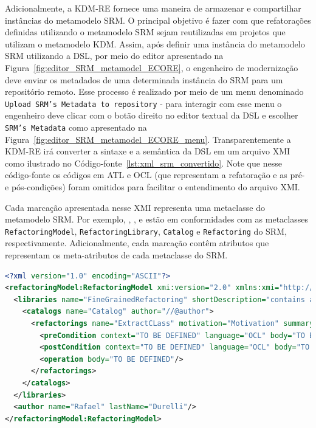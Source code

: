 Adicionalmente, a KDM-RE fornece uma maneira de armazenar e compartilhar instâncias do metamodelo SRM. O principal objetivo é fazer com que refatorações definidas utilizando o metamodelo SRM sejam reutilizadas em projetos que utilizam o metamodelo KDM. Assim, após definir uma instância do metamodelo SRM utilizando a DSL, por meio do editor apresentado na Figura~\ref{fig:editor_SRM_metamodel_ECORE}, o engenheiro de modernização deve enviar os metadados de uma determinada instância do SRM para um repositório remoto. Esse processo é realizado por meio de um menu denominado \texttt{Upload SRM's Metadata to repository} - para interagir com esse menu o engenheiro deve clicar com o botão direito no editor textual da DSL e escolher \texttt{SRM's Metadata} como apresentado na Figura~\ref{fig:editor_SRM_metamodel_ECORE_menu}. Transparentemente a KDM-RE irá converter a sintaxe e a semântica da DSL em um arquivo XMI como ilustrado no Código-fonte~\ref{lst:xml_srm_convertido}. Note que nesse código-fonte os códigos em ATL e OCL (que representam a refatoração e as pré- e pós-condições) foram omitidos para facilitar o entendimento do arquivo XMI. 

Cada marcação apresentada nesse XMI representa uma metaclasse do metamodelo SRM. Por exemplo, , ,  e  estão em conformidades com as metaclasses \texttt{RefactoringModel}, \texttt{RefactoringLibrary}, \texttt{Catalog} e \texttt{Refactoring} do SRM, respectivamente. Adicionalmente, cada marcação contêm atributos que representam os meta-atributos de cada metaclasse do SRM.

\begin{lstlisting}[language=XML, frame=single, basicstyle={\scriptsize}, mathescape=true, label={lst:xml_srm_convertido}, caption={Arquivo XMI representando a instância do SRM.}]
<?xml version="1.0" encoding="ASCII"?>
<refactoringModel:RefactoringModel xmi:version="2.0" xmlns:xmi="http://www.omg.org/XMI" xmlns:xsi="http://www.w3.org/2001/XMLSchema-instance" xmlns:refactoringModel="http://refactoringModel/1.0">
  <libraries name="FineGrainedRefactoring" shortDescription="contains a set of refactorings" description="refactorings">
    <catalogs name="Catalog" author="//@author">
      <refactorings name="ExtractCLass" motivation="Motivation" summary="Summary">
        <preCondition context="TO BE DEFINED" language="OCL" body="TO BE DEFINED"/>
        <postCondition context="TO BE DEFINED" language="OCL" body="TO BE DEFINED"/>
        <operation body="TO BE DEFINED"/>
      </refactorings>
    </catalogs>
  </libraries>
  <author name="Rafael" lastName="Durelli"/>
</refactoringModel:RefactoringModel>
\end{lstlisting}


